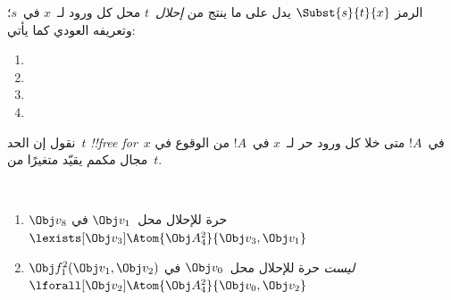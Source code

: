 \documentclass[../../../include/open-logic-section]{subfiles}
\begin{document}


\begin{defn}[الإحلال في حد]
الرمز $\Subst{s}{t}{x}$ يدل على ما ينتج من \emph{إحلال}~$t$
محل كل ورود لـ~$x$ في~$s$؛ وتعريفه العودي كما يأتي:
\begin{enumerate}
\item {}

\item {}

\item {}

\item{}
\end{enumerate}
\end{defn}

\begin{defn}
نقول إن الحد~$t$ \emph{!!{free for}}~$x$ في~$!A$ متى خلا كل ورود
حر لـ~$x$ في~$!A$ من الوقوع في مجال مكمم يقيّد متغيرًا من~$t$.
\end{defn}

\begin{ex} ~
\begin{enumerate}
\item $\Obj v_8$ حرة للإحلال محل~$\Obj v_1$ في
  $\lexists[\Obj v_3]\Atom{\Obj A^2_4}{\Obj v_3,\Obj v_1}$

\item $\Obj f^2_1(\Obj v_1, \Obj v_2)$ \emph{ليست} حرة للإحلال
  محل~$\Obj v_0$ في
  $\lforall[\Obj v_2]\Atom{\Obj A^2_4}{\Obj v_0,\Obj v_2}$
\end{enumerate}
\end{ex}
\end{document}
